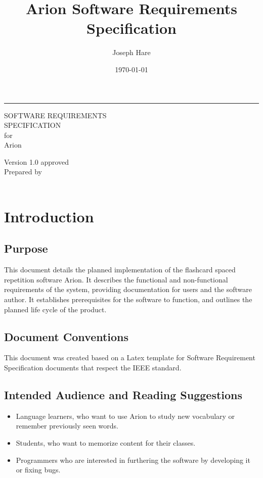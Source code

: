 \documentclass{scrreprt}
\title{Arion Software Requirements Specification}
\author{Joseph Hare}
\date{\today}
\makeatletter
\newcommand{\theauthor}{\@author}
\newcommand{\thedate}{\@date}
\newcommand{\version}{1.0 }
\newcommand{\bigspace}{\vspace{1.9cm}}
\newcommand{\smallspace}{\vspace{0.5cm}}
\makeatother
\begin{document}
\begin{flushright}
    \rule{\linewidth}{5pt}
    \vskip 1cm
    \begin{bfseries}
        \Huge
        SOFTWARE REQUIREMENTS\\
        SPECIFICATION\\
        \smallspace
        for\\
        \smallspace
        Arion\\
        \bigspace

        \LARGE
        Version \version approved\\
        \smallspace
        Prepared by \theauthor\\
        \smallspace
        \thedate\\
    \end{bfseries}
\end{flushright}

\tableofcontents


\chapter{Introduction}

\section{Purpose}
This document details the planned implementation of the flashcard spaced repetition software Arion.
It describes the functional and non-functional requirements of the system, providing documentation for users
and the software author.
It establishes prerequisites for the software to function, and outlines the planned life cycle of the product.

\section{Document Conventions}
This document was created based on a Latex template for Software Requirement Specification documents that
respect the IEEE standard.

\section{Intended Audience and Reading Suggestions}
\begin{itemize}
    \item Language learners, who want to use Arion to study new vocabulary or remember previously seen words.
    \item Students, who want to memorize content for their classes.
    \item Programmers who are interested in furthering the software by developing it or
fixing bugs. 
\end{itemize}
\end{document}
